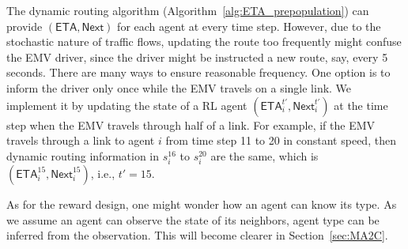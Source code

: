 The dynamic routing algorithm (Algorithm~\ref{alg:ETA_prepopulation}) can provide $(\mathsf{ETA}, \mathsf{Next})$ for each agent at every time step. However, due to the stochastic nature of traffic flows, updating the route too frequently might confuse the EMV driver, since the driver might be instructed a new route, say, every 5 seconds. 
There are many ways to ensure reasonable frequency. One option is to inform the driver only once while the EMV travels on a single link. We implement it by updating the state of a RL agent $(\mathsf{ETA}^{t'}_i, \mathsf{Next}^{t'}_i)$ at the time step when the EMV travels through half of a link. For example, if the EMV travels through a link to agent $i$ from time step 11 to 20 in constant speed, then dynamic routing information in $s_i^{16}$ to $s_i^{20}$ are the same, which is $(\mathsf{ETA}_i^{15}, \mathsf{Next}_i^{15})$, i.e., $t'=15$.

As for the reward design, one might wonder how an agent can know its type. As we assume an agent can observe the state of its neighbors, agent type can be inferred from the observation. This will become clearer in Section~\ref{sec:MA2C}.





